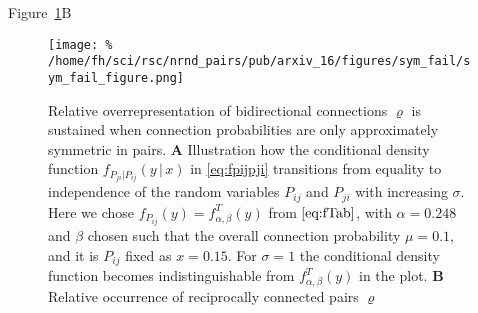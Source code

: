 Figure~\ref{fig:sym_fail}B

\begin{figure}[h!]
\centering
\texttt{[image: \%
  /home/fh/sci/rsc/nrnd\_pairs/pub/arxiv\_16/figures/sym\_fail/sym\_fail\_figure.png]}
\caption{Relative overrepresentation of bidirectional connections $\varrho$ is sustained when connection probabilities are only approximately symmetric in pairs. \textbf{A} Illustration how the conditional density function $f_{P_{ji} | P_{ij}} (y\,\vert\, x)$ in \eqref{eq:fpijpji} transitions from equality to independence of the random variables $P_{ij}$ and $P_{ji}$ with increasing $\sigma$. Here we chose $f_{P_{ij}} (y) = f^T_{\alpha,\beta}(y)$ from $\eqref{eq:fTab}$, with $\alpha=0.248$ and $\beta$ chosen such that the overall connection probability $\mu=0.1$, and it is $P_{ij}$ fixed as $x=0.15$. For $\sigma=1$ the conditional density function becomes indistinguishable from  $f^T_{\alpha,\beta}(y)$ in the plot. \textbf{B} Relative occurrence of reciprocally connected pairs $\varrho$  } 
\label{fig:sym_fail}
\end{figure}


%

